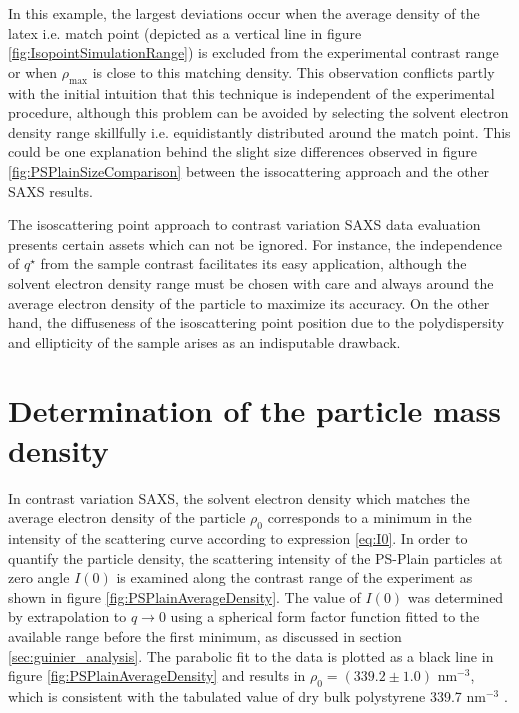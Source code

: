 In this example, the largest deviations occur when the average density of the latex i.e. match point (depicted as a vertical line in figure \ref{fig:IsopointSimulationRange}) is excluded from the experimental contrast range or when $\rho_{\text{max}}$ is close to this matching density. This observation conflicts partly with the initial intuition that this technique is independent of the experimental procedure, although this problem can be avoided by selecting the solvent electron density range skillfully i.e. equidistantly distributed around the match point. This could be one explanation behind the slight size differences observed in figure \ref{fig:PSPlainSizeComparison} between the issocattering approach and the other SAXS results.

The isoscattering point approach to contrast variation SAXS data evaluation presents certain assets which can not be ignored. For instance, the independence of $q^{\star}$ from the sample contrast facilitates its easy application, although the solvent electron density range must be chosen with care and always around the average electron density of the particle to maximize its accuracy. On the other hand, the diffuseness of the isoscattering point position due to the polydispersity and ellipticity of the sample arises as an indisputable drawback.

\section{Determination of the particle mass density}
\label{sec:physical_density}
In contrast variation SAXS, the solvent electron density which matches the average electron density of the particle $\rho_0$ corresponds to a minimum in the intensity of the scattering curve  according to expression \ref{eq:I0}. In order to quantify the particle density, the scattering intensity of the PS-Plain particles at zero angle $I(0)$ is examined along the contrast range of the experiment as shown in figure \ref{fig:PSPlainAverageDensity}. The value of $I(0)$ was determined by extrapolation to $q\rightarrow 0$ using a spherical form factor function fitted to the available range before the first minimum, as discussed in section \ref{sec:guinier_analysis}. The parabolic fit to the data is plotted as a black line in figure \ref{fig:PSPlainAverageDensity} and results in $\rho_0=\left(339.2\pm1.0\right)$ nm$^{-3}$, which is consistent with the tabulated value of dry bulk polystyrene 339.7 nm$^{-3}$ \citep{dingenouts_analysis_1999}.


